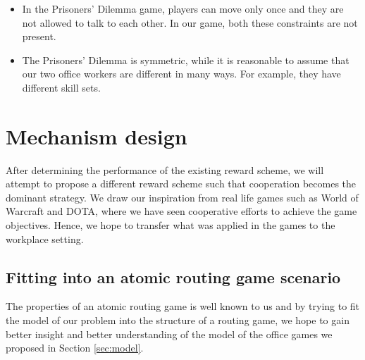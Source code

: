 \documentclass[11pt, a4paper]{article}
\begin{document}
	\begin{itemize}
		\item In the Prisoners' Dilemma game, players can move only once and they are not allowed to talk to each other. In our game, both these constraints are not present.
		\item The Prisoners' Dilemma is symmetric, while it is reasonable to assume that our two office workers are different in many ways. For example, they have different skill sets.		
	\end{itemize}
	
	\section{Mechanism design}
	After determining the performance of the existing reward scheme, we will attempt to propose a different reward scheme such that cooperation becomes the dominant strategy. We draw our inspiration from real life games such as World of Warcraft and DOTA, where we have seen cooperative efforts to achieve the game objectives. Hence, we hope to transfer what was applied in the games to the workplace setting.
	
	\subsection{Fitting into an atomic routing game scenario}
	The properties of an atomic routing game is well known to us and by trying to fit the model of our problem into the structure of a routing game, we hope to gain better insight and better understanding of the model of the office games we proposed in Section \ref{sec:model}.
	
\end{document}
